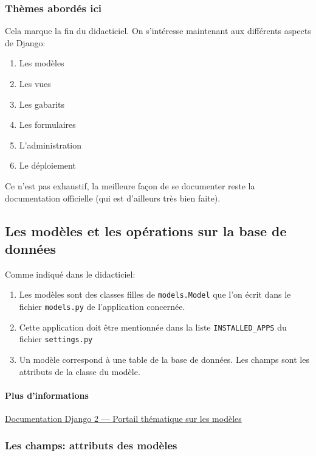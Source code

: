 \documentclass[a4paper, 10pt]{article}
\begin{document}
\subsubsection{Thèmes abordés ici}

Cela marque la fin du didacticiel. On s'intéresse maintenant aux différents aspects de Django:
\begin{enumerate}
    \item Les modèles
    \item Les vues
    \item Les gabarits
    \item Les formulaires
    \item L'administration
    \item Le déploiement
\end{enumerate}

Ce n'est pas exhaustif, la meilleure façon de se documenter reste la documentation officielle (qui est d'ailleurs très bien faite).

\subsection{Les modèles et les opérations sur la base de données}

Comme  indiqué dans le didacticiel:
\begin{enumerate}
    \item Les modèles sont des classes filles de \texttt{models.Model} que l'on écrit dans le fichier \texttt{models.py} de l'application concernée.
    \item Cette application doit être mentionnée dans la liste \texttt{INSTALLED_APPS} du fichier \texttt{settings.py}
    \item Un modèle correspond à une table de la base de données. Les champs sont les attributs de la classe du modèle.
\end{enumerate}

\paragraph{Plus d'informations} \href{https://docs.djangoproject.com/fr/2.2/topics/db/}{Documentation Django 2 --- Portail thématique sur les modèles}

\subsubsection{Les champs: attributs des modèles}
\end{document}

